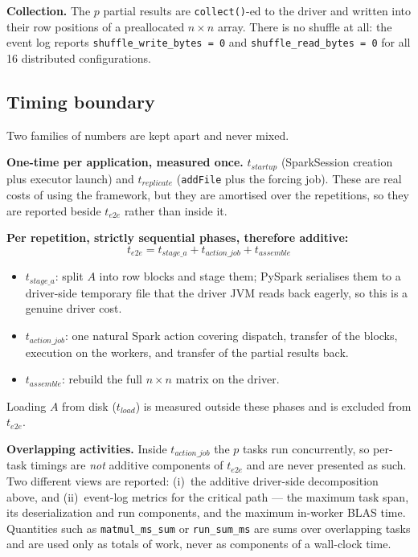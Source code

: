 \documentclass[11pt,a4paper]{article}
\begin{document}
\textbf{Collection.}
The $p$ partial results are \texttt{collect()}-ed to the driver and
written into their row positions of a preallocated $n \times n$ array.
There is no shuffle at all: the event log reports
\texttt{shuffle\_write\_bytes = 0} and \texttt{shuffle\_read\_bytes = 0}
for all 16 distributed configurations.

\subsection{Timing boundary}

Two families of numbers are kept apart and never mixed.

\textbf{One-time per application, measured once.}
$t_{startup}$ (SparkSession creation plus executor launch) and
$t_{replicate}$ (\texttt{addFile} plus the forcing job). These are real
costs of using the framework, but they are amortised over the
repetitions, so they are reported beside $t_{e2e}$ rather than inside it.

\textbf{Per repetition, strictly sequential phases, therefore additive:}
\begin{equation}
  t_{e2e} = t_{stage\_a} + t_{action\_job} + t_{assemble}
\end{equation}
\begin{itemize}
  \item $t_{stage\_a}$: split $A$ into row blocks and stage them;
        PySpark serialises them to a driver-side temporary file that the
        driver JVM reads back eagerly, so this is a genuine driver cost.
  \item $t_{action\_job}$: one natural Spark action covering dispatch,
        transfer of the blocks, execution on the workers, and transfer of
        the partial results back.
  \item $t_{assemble}$: rebuild the full $n \times n$ matrix on the
        driver.
\end{itemize}
Loading $A$ from disk ($t_{load}$) is measured outside these phases and
is excluded from $t_{e2e}$.

\textbf{Overlapping activities.}
Inside $t_{action\_job}$ the $p$ tasks run concurrently, so per-task
timings are \emph{not} additive components of $t_{e2e}$ and are never
presented as such. Two different views are reported: (i)~the additive
driver-side decomposition above, and (ii)~event-log metrics for the
critical path --- the maximum task span, its deserialization and run
components, and the maximum in-worker BLAS time. Quantities such as
\texttt{matmul\_ms\_sum} or \texttt{run\_sum\_ms} are sums over
overlapping tasks and are used only as totals of work, never as
components of a wall-clock time.
\end{document}
